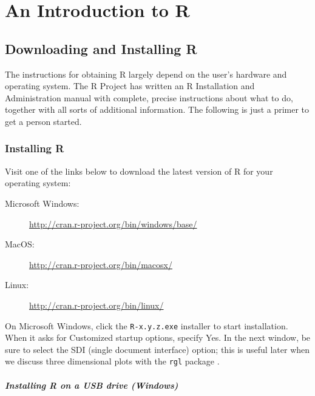\documentclass[captions=tableheading]{scrbook}
\begin{document}
\setcounter{thm}{0}
\chapter{An Introduction to \textsf{R}}
\label{sec-2}

\label{cha:introduction-to-R}
\section{Downloading and Installing \textsf{R}}
\label{sec-2-1}

\label{sec:download-install-R}

The instructions for obtaining \textsf{R} largely depend on the user's hardware and operating system. The \textsf{R} Project has written an \textsf{R} Installation and Administration manual with complete, precise instructions about what to do, together with all sorts of additional information. The following is just a primer to get a person started.
\subsection{Installing \textsf{R}}
\label{sec-2-1-1}


Visit one of the links below to download the latest version of \textsf{R}
for your operating system:

\begin{description}
\item[Microsoft Windows:] \href{http://cran.r-project.org/bin/windows/base/}{http://cran.r-project.org/bin/windows/base/}
\item[MacOS:] \href{http://cran.r-project.org/bin/macosx/}{http://cran.r-project.org/bin/macosx/}
\item[Linux:] \href{http://cran.r-project.org/bin/linux/}{http://cran.r-project.org/bin/linux/}
\end{description}

On Microsoft Windows, click the \texttt{R-x.y.z.exe} installer to start installation. When it asks for \textquotedbl{}Customized startup options\textquotedbl{}, specify \textsf{Yes}. In the next window, be sure to select the SDI (single document interface) option; this is useful later when we discuss three dimensional plots with the \texttt{rgl} package \cite{rgl}.

\paragraph*{Installing \textsf{R} on a USB drive (Windows)}
\end{document}
